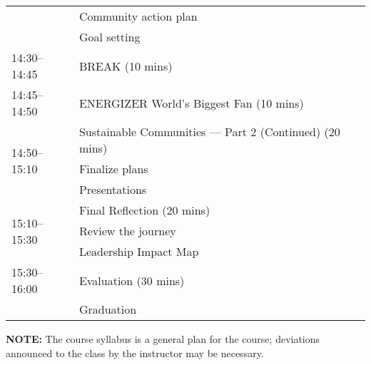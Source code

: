 \documentclass[11pt,a4paper]{article}
\begin{document}
\begin{longtable}[l]{ll}
	& Community action plan                                                                    \\
	& Goal setting                                                                             \\
	14:30--14:45                                                                     & BREAK                                                                      (10 mins)        \\
	14:45--14:50                                                                     & ENERGIZER World's Biggest Fan                                               (10 mins)        \\
	\multirow{3}{*}{14:50--15:10}                                                    & Sustainable Communities --- Part 2 (Continued)                                (20 mins)        \\
	& Finalize plans                                                                           \\
	& Presentations                                                                             \\
	\multirow{3}{*}{15:10--15:30}                                                    & Final Reflection                                                         (20 mins)        \\
	& Review the journey                                                                       \\
	& Leadership Impact Map                                                                     \\
	15:30--16:00                                                                     & Evaluation                                                                 (30 mins)        \\
	& Graduation                                                                           
\end{longtable}
\vspace{-1em}

\textbf{NOTE:} The course syllabus is a general plan for the course; deviations announced to the class by the
instructor may be necessary.
\end{document}
